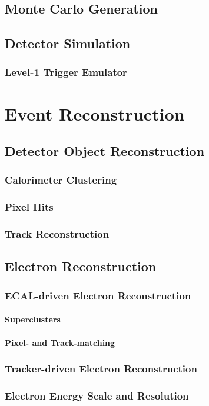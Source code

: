 \documentclass [11pt, twoside] {uwthesis}
\begin{document}
\section{Monte Carlo Generation}
\section{Detector Simulation}
\subsection{Level-1 Trigger Emulator}
\chapter{Event Reconstruction}
\section{Detector Object Reconstruction}
\subsection{Calorimeter Clustering}
\subsection{Pixel Hits}
\subsection{Track Reconstruction}
\section{Electron Reconstruction}
\subsection{ECAL-driven Electron Reconstruction}
\subsubsection{Superclusters}
\subsubsection{Pixel- and Track-matching}
\subsection{Tracker-driven Electron Reconstruction}
\subsection{Electron Energy Scale and Resolution}
\end{document}
